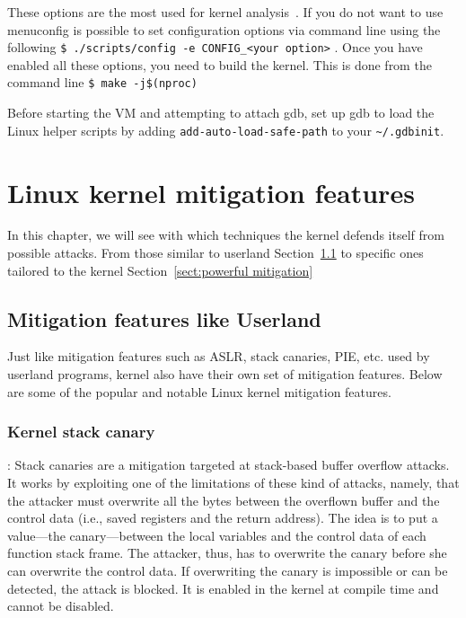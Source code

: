 \documentclass{masterthesis}
\newcommand{\refToSection}[1]{Section~\ref{sect:#1}\xspace}
\begin{document}
These options are the most used for kernel analysis~\cite{kernel_analysis}.
If you do not want to use menuconfig is possible to set configuration options via command line using the following
\lstinline{$ ./scripts/config -e CONFIG_<your option>} .
Once you have enabled all these options, you need to build the kernel.
This is done from the command line \lstinline{$ make -j$(nproc)}

Before starting the VM and attempting to attach gdb, set up gdb to load the Linux helper scripts by adding \lstinline[language={}]{add-auto-load-safe-path} to your \lstinline{~/.gdbinit}.

\chapter{Linux kernel mitigation features}
\label{ch:mitigation}
In this chapter, we will see with which techniques the kernel defends itself from possible attacks.
From those similar to userland \refToSection{like userland} to specific ones tailored to the kernel \refToSection{powerful mitigation}
\section{Mitigation features like Userland}
\label{sect:like userland}
Just like mitigation features such as ASLR, stack canaries, PIE, etc. used by userland programs, kernel also have their own set of mitigation features. Below are some of the popular and notable Linux kernel mitigation features.

\subsection{Kernel stack canary}:
\label{subsect:canary}
Stack canaries are a mitigation targeted at stack-based buffer overflow attacks. It works by exploiting one of the limitations of these kind of attacks, namely, that the attacker must overwrite all the bytes between the overflown buffer and the control data (i.e., saved registers and the return address). The idea is to put a value—the canary—between the local variables and the control data of each function stack frame. The attacker, thus, has to overwrite the canary before she can overwrite the control data. If overwriting the canary is impossible or can be detected, the attack is blocked.
It is enabled in the kernel at compile time and cannot be disabled.
\end{document}
